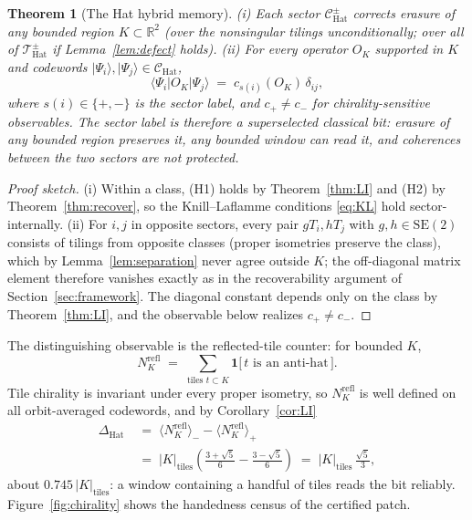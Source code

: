 \documentclass[a4paper,unpublished]{quantumarticle}
\newtheorem{theorem}{Theorem}
\theoremstyle{remark}
\newcommand{\THat}{\mathcal{T}_{\mathrm{Hat}}}
\newcommand{\CHat}{\mathcal{C}_{\mathrm{Hat}}}
\newcommand{\RR}{\mathbb{R}}
\newcommand{\SEtwo}{\mathrm{SE}(2)}
\begin{document}
\begin{theorem}[The Hat hybrid memory]
\label{thm:hatcode}
(i) Each sector $\CHat^{\pm}$ corrects erasure of any bounded
region $K \subset \RR^{2}$ (over the nonsingular tilings
unconditionally; over all of $\THat^{\pm}$ if
Lemma~\ref{lem:defect} holds).
(ii) For every operator $O_{K}$ supported in $K$ and codewords
$|\Psi_{i}\rangle, |\Psi_{j}\rangle \in \CHat$,
\[
\langle \Psi_{i} | O_{K} | \Psi_{j} \rangle
\;=\; c_{s(i)}(O_{K})\, \delta_{ij} ,
\]
where $s(i) \in \{+,-\}$ is the sector label, and
$c_{+} \neq c_{-}$ for chirality-sensitive observables. The sector
label is therefore a \emph{superselected classical bit}: erasure of
any bounded region preserves it, any bounded window can read it, and
coherences between the two sectors are not protected.
\end{theorem}

\begin{proof}[Proof sketch]
(i) Within a class, (H1) holds by Theorem~\ref{thm:LI} and (H2) by
Theorem~\ref{thm:recover}, so the Knill--Laflamme conditions
\eqref{eq:KL} hold sector-internally. (ii) For $i, j$ in opposite
sectors, every pair $gT_{i}, hT_{j}$ with $g, h \in \SEtwo$
consists of tilings from opposite classes (proper isometries preserve
the class), which by Lemma~\ref{lem:separation} never agree outside
$K$; the off-diagonal matrix element therefore vanishes exactly as in
the recoverability argument of Section~\ref{sec:framework}. The
diagonal constant depends only on the class by
Theorem~\ref{thm:LI}, and the observable below realizes
$c_{+} \neq c_{-}$.
\end{proof}

The distinguishing observable is the reflected-tile counter: for
bounded $K$,
\[
N^{\mathrm{refl}}_{K} \;=\;
\sum_{\text{tiles } t \subset K}
\mathbf{1}\bigl[\, t \text{ is an anti-hat} \,\bigr] .
\]
Tile chirality is invariant under every proper isometry, so
$N^{\mathrm{refl}}_{K}$ is well defined on all orbit-averaged
codewords, and by Corollary~\ref{cor:LI}
\begin{equation}
\begin{aligned}
\Delta_{\mathrm{Hat}}
&\;=\; \bigl\langle N^{\mathrm{refl}}_{K} \bigr\rangle_{-}
- \bigl\langle N^{\mathrm{refl}}_{K} \bigr\rangle_{+} \\
&\;=\; |K|_{\mathrm{tiles}}
\left( \tfrac{3+\sqrt{5}}{6} - \tfrac{3-\sqrt{5}}{6} \right)
\;=\; |K|_{\mathrm{tiles}}\, \frac{\sqrt{5}}{3} ,
\end{aligned}
\label{eq:DeltaHat}
\end{equation}
about $0.745\, |K|_{\mathrm{tiles}}$: a window containing a handful
of tiles reads the bit reliably. Figure~\ref{fig:chirality} shows
the handedness census of the certified patch.
\end{document}
